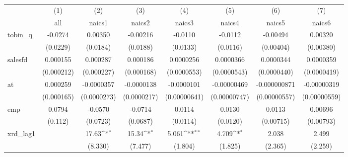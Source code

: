 {
\def\sym#1{\ifmmode^{#1}\else\(^{#1}\)\fi}
\begin{tabular}{l*{7}{c}}
\hline\hline
            &\multicolumn{1}{c}{(1)}&\multicolumn{1}{c}{(2)}&\multicolumn{1}{c}{(3)}&\multicolumn{1}{c}{(4)}&\multicolumn{1}{c}{(5)}&\multicolumn{1}{c}{(6)}&\multicolumn{1}{c}{(7)}\\
            &\multicolumn{1}{c}{all}&\multicolumn{1}{c}{naics1}&\multicolumn{1}{c}{naics2}&\multicolumn{1}{c}{naics3}&\multicolumn{1}{c}{naics4}&\multicolumn{1}{c}{naics5}&\multicolumn{1}{c}{naics6}\\
\hline
tobin\_q     &     -0.0274         &     0.00350         &    -0.00216         &     -0.0110         &     -0.0112         &    -0.00494         &     0.00320         \\
            &    (0.0229)         &    (0.0184)         &    (0.0188)         &    (0.0133)         &    (0.0116)         &   (0.00404)         &   (0.00380)         \\
[1em]
salesfd     &    0.000155         &    0.000287         &    0.000186         &   0.0000256         &   0.0000366         &   0.0000344         &   0.0000359         \\
            &  (0.000212)         &  (0.000227)         &  (0.000168)         & (0.0000553)         & (0.0000543)         & (0.0000440)         & (0.0000419)         \\
[1em]
at          &    0.000259         &  -0.0000357         &  -0.0000138         &  -0.0000101         & -0.00000469         &-0.000000871         & -0.00000319         \\
            &  (0.000165)         & (0.0000273)         & (0.0000217)         &(0.00000641)         &(0.00000747)         &(0.00000557)         &(0.00000559)         \\
[1em]
emp         &      0.0794         &     -0.0570         &     -0.0714         &      0.0114         &      0.0130         &      0.0113         &     0.00696         \\
            &     (0.112)         &    (0.0723)         &    (0.0687)         &    (0.0114)         &    (0.0120)         &   (0.00715)         &   (0.00793)         \\
[1em]
xrd\_lag1    &                     &       17.63\sym{*}  &       15.34\sym{*}  &       5.061\sym{**} &       4.709\sym{*}  &       2.038         &       2.499         \\
            &                     &     (8.330)         &     (7.477)         &     (1.804)         &     (1.825)         &     (2.365)         &     (2.259)         \\

\end{tabular}}
